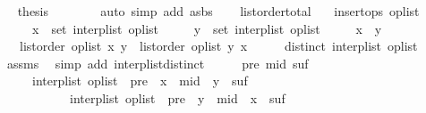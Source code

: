 \begin{isabellebody}
\ \isamarkupfalse%
\ {\isacharquery}thesis\isanewline
\ \ \ \ \ \ \isamarkupfalse%
\ {\isacharparenleft}auto\ simp\ add{\isacharcolon}\ as{\isacharunderscore}bs{\isacharparenright}\isanewline
\ \ \isamarkupfalse%
\isanewline
{}\isamarkupfalse%
%
\endisatagproof
{\isafoldproof}%
%
\isadelimproof
\isanewline
%
\endisadelimproof
\isanewline
{}\isamarkupfalse%
\ list{\isacharunderscore}order{\isacharunderscore}total{\isacharcolon}\isanewline
\ \ \ {\isachardoublequoteopen}insert{\isacharunderscore}ops\ op{\isacharunderscore}list{\isachardoublequoteclose}\isanewline
\ \ \ \ \ {\isachardoublequoteopen}x\ {\isasymin}\ set\ {\isacharparenleft}interp{\isacharunderscore}list\ op{\isacharunderscore}list{\isacharparenright}{\isachardoublequoteclose}\isanewline
\ \ \ \ \ {\isachardoublequoteopen}y\ {\isasymin}\ set\ {\isacharparenleft}interp{\isacharunderscore}list\ op{\isacharunderscore}list{\isacharparenright}{\isachardoublequoteclose}\isanewline
\ \ \ \ \ {\isachardoublequoteopen}x\ {\isasymnoteq}\ y{\isachardoublequoteclose}\isanewline
\ \ \ {\isachardoublequoteopen}list{\isacharunderscore}order\ op{\isacharunderscore}list\ x\ y\ {\isasymor}\ list{\isacharunderscore}order\ op{\isacharunderscore}list\ y\ x{\isachardoublequoteclose}\isanewline
%
\isadelimproof
%
\endisadelimproof
%
\isatagproof
{}\isamarkupfalse%
\ {\isacharminus}\isanewline
\ \ \isamarkupfalse%
\ {\isachardoublequoteopen}distinct\ {\isacharparenleft}interp{\isacharunderscore}list\ op{\isacharunderscore}list{\isacharparenright}{\isachardoublequoteclose}\isanewline
\ \ \ \ \isamarkupfalse%
\ assms{\isacharparenleft}{}{\isacharparenright}\ \isamarkupfalse%
\ {\isacharparenleft}simp\ add{\isacharcolon}\ interp{\isacharunderscore}list{\isacharunderscore}distinct{\isacharparenright}\isanewline
\ \ \isamarkupfalse%
\ \isamarkupfalse%
\ pre\ mid\ suf\isanewline
\ \ \ \ \ {\isachardoublequoteopen}interp{\isacharunderscore}list\ op{\isacharunderscore}list\ {\isacharequal}\ pre\ {\isacharat}\ x\ {\isacharhash}\ mid\ {\isacharat}\ y\ {\isacharhash}\ suf\ {\isasymor}\isanewline
\ \ \ \ \ \ \ \ \ \ \ interp{\isacharunderscore}list\ op{\isacharunderscore}list\ {\isacharequal}\ pre\ {\isacharat}\ y\ {\isacharhash}\ mid\ {\isacharat}\ x\ {\isacharhash}\ suf{\isachardoublequoteclose}\isanewline
\ \ \ \ \isamarkupfalse%

\end{isabellebody}

